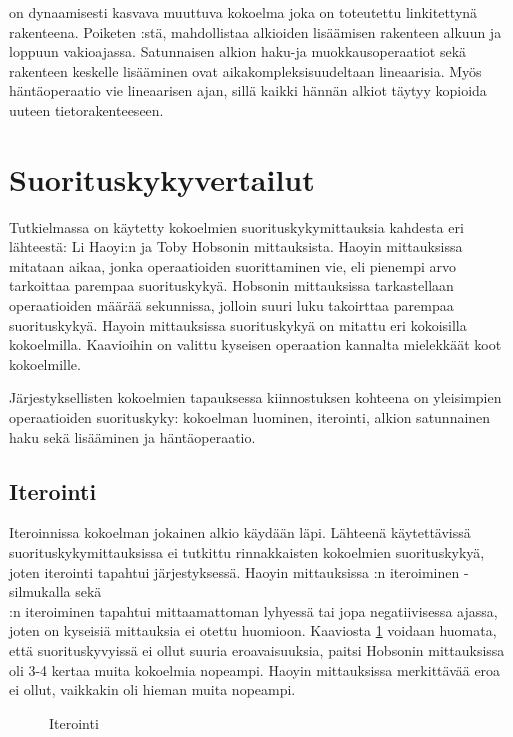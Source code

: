  on dynaamisesti kasvava muuttuva kokoelma joka on toteutettu linkitettynä rakenteena. Poiketen :stä,  mahdollistaa alkioiden lisäämisen rakenteen alkuun ja loppuun vakioajassa. Satunnaisen alkion haku-ja muokkausoperaatiot sekä rakenteen keskelle lisääminen ovat aikakompleksisuudeltaan lineaarisia. Myös häntäoperaatio vie lineaarisen ajan, sillä kaikki hännän alkiot täytyy kopioida uuteen tietorakenteeseen.   
\cite{scalaCollections}


\section{Suorituskykyvertailut}
Tutkielmassa on käytetty kokoelmien suorituskykymittauksia kahdesta eri lähteestä: Li Haoyi:n\cite{haoyiBenchmark} ja Toby Hobsonin\cite{hobsonBenchmark} mittauksista. Haoyin mittauksissa mitataan aikaa, jonka operaatioiden suorittaminen vie, eli pienempi arvo tarkoittaa parempaa suorituskykyä. Hobsonin mittauksissa tarkastellaan operaatioiden määrää sekunnissa, jolloin suuri luku takoirttaa parempaa suorituskykyä. Hayoin mittauksissa suorituskykyä on mitattu eri kokoisilla kokoelmilla. Kaavioihin on valittu kyseisen operaation kannalta mielekkäät koot kokoelmille.

Järjestyksellisten kokoelmien tapauksessa kiinnostuksen kohteena on yleisimpien operaatioiden suorituskyky: kokoelman luominen, iterointi, alkion satunnainen haku sekä lisääminen ja häntäoperaatio. 


\subsection{Iterointi}
Iteroinnissa kokoelman jokainen alkio käydään läpi. Lähteenä käytettävissä suorituskykymittauksissa ei tutkittu rinnakkaisten kokoelmien suorituskykyä, joten iterointi tapahtui järjestyksessä. Haoyin mittauksissa :n iteroiminen -silmukalla sekä \\:n iteroiminen tapahtui mittaamattoman lyhyessä tai jopa negatiivisessa ajassa, joten on kyseisiä mittauksia ei otettu huomioon. Kaaviosta \ref{iterointi_kaavio} voidaan huomata, että suorituskyvyissä ei ollut suuria eroavaisuuksia, paitsi Hobsonin mittauksissa  oli 3-4 kertaa muita kokoelmia nopeampi. Haoyin mittauksissa merkittävää eroa ei ollut, vaikkakin  oli hieman muita nopeampi.

\begin{figure}[h]
    \centering
    
    \caption{Iterointi}\label{iterointi_kaavio}
\end{figure}


